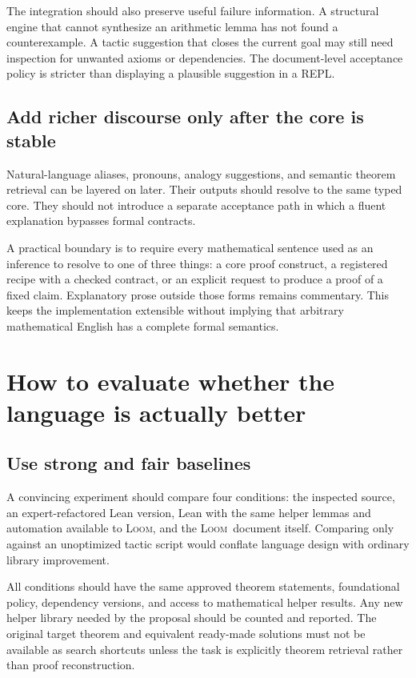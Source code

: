 \documentclass[11pt,letterpaper]{article}
\newcommand{\Loom}{\textsc{Loom}}
\theoremstyle{remark}
\begin{document}
The integration should also preserve useful failure information. A structural engine that cannot synthesize an arithmetic lemma has not found a counterexample. A tactic suggestion that closes the current goal may still need inspection for unwanted axioms or dependencies. The document-level acceptance policy is stricter than displaying a plausible suggestion in a REPL.

\subsection{Add richer discourse only after the core is stable}

Natural-language aliases, pronouns, analogy suggestions, and semantic theorem retrieval can be layered on later. Their outputs should resolve to the same typed core. They should not introduce a separate acceptance path in which a fluent explanation bypasses formal contracts.

A practical boundary is to require every mathematical sentence used as an inference to resolve to one of three things: a core proof construct, a registered recipe with a checked contract, or an explicit request to produce a proof of a fixed claim. Explanatory prose outside those forms remains commentary. This keeps the implementation extensible without implying that arbitrary mathematical English has a complete formal semantics.

\section{How to evaluate whether the language is actually better}
\label{sec:evaluation}

\subsection{Use strong and fair baselines}

A convincing experiment should compare four conditions: the inspected source, an expert-refactored Lean version, Lean with the same helper lemmas and automation available to \Loom, and the \Loom\ document itself. Comparing only against an unoptimized tactic script would conflate language design with ordinary library improvement.

All conditions should have the same approved theorem statements, foundational policy, dependency versions, and access to mathematical helper results. Any new helper library needed by the proposal should be counted and reported. The original target theorem and equivalent ready-made solutions must not be available as search shortcuts unless the task is explicitly theorem retrieval rather than proof reconstruction.
\end{document}
